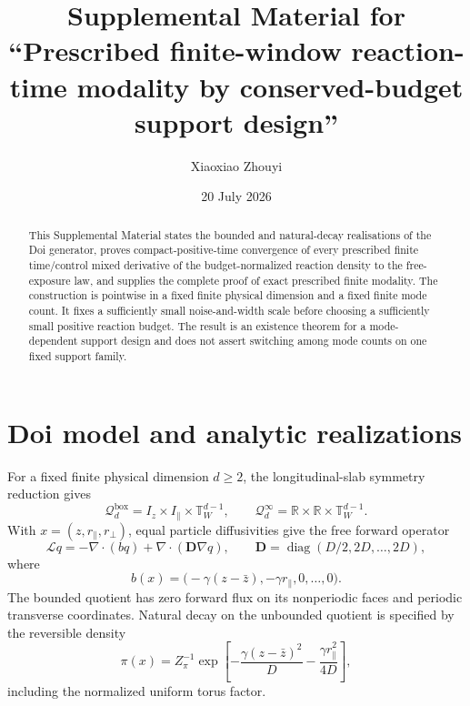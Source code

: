 \documentclass[aps,physrev,onecolumn,amsmath,amssymb,longbibliography]{revtex4-2}
\newcommand{\Lfree}{\mathcal L}
\newcommand{\Qbox}{\mathcal Q_d^{\mathrm{box}}}
\newcommand{\Qinf}{\mathcal Q_d^{\infty}}
\begin{document}
\title{Supplemental Material for ``Prescribed finite-window reaction-time
modality by conserved-budget support design''}

\author{Xiaoxiao Zhouyi}

\date{20 July 2026}

\begin{abstract}
This Supplemental Material states the bounded and natural-decay
realisations of the Doi generator, proves compact-positive-time convergence
of every prescribed finite time/control mixed derivative of the
budget-normalized reaction density to the free-exposure law, and supplies the
complete proof of exact prescribed finite modality.  The construction is
pointwise in a fixed finite physical dimension and a fixed finite mode count.
It fixes a sufficiently small noise-and-width scale before choosing a
sufficiently small positive reaction budget.  The result is an existence
theorem for a mode-dependent support design and does not assert switching
among mode counts on one fixed support family.
\end{abstract}

\maketitle

\section{Doi model and analytic realizations}
\label{sec:supp-model}

For a fixed finite physical dimension \(d\ge2\), the longitudinal-slab
symmetry reduction gives
\begin{equation}
 \Qbox=I_z\times I_\parallel\times\mathbb T_W^{d-1},
 \qquad
 \Qinf=\mathbb R\times\mathbb R\times\mathbb T_W^{d-1}.
 \label{eq:supp-domains}
\end{equation}
With \(x=(z,r_\parallel,r_\perp)\), equal particle diffusivities give the free
forward operator
\begin{equation}
 \Lfree q=-\nabla\!\cdot(bq)+\nabla\!\cdot(\bm D\nabla q),
 \qquad
 \bm D=\operatorname{diag}(D/2,2D,\ldots,2D),
 \label{eq:supp-free-generator}
\end{equation}
where
\begin{equation}
 b(x)=\bigl(-\gamma(z-\bar z),-\gamma r_\parallel,0,\ldots,0\bigr).
 \label{eq:supp-drift}
\end{equation}
The bounded quotient has zero forward flux on its nonperiodic faces and
periodic transverse coordinates.  Natural decay on the unbounded quotient is
specified by the reversible density
\begin{equation}
 \pi(x)=Z_\pi^{-1}
 \exp\!\left[-\frac{\gamma(z-\bar z)^2}{D}
              -\frac{\gamma r_\parallel^2}{4D}\right],
 \label{eq:supp-pi}
\end{equation}
including the normalized uniform torus factor.
\end{document}
